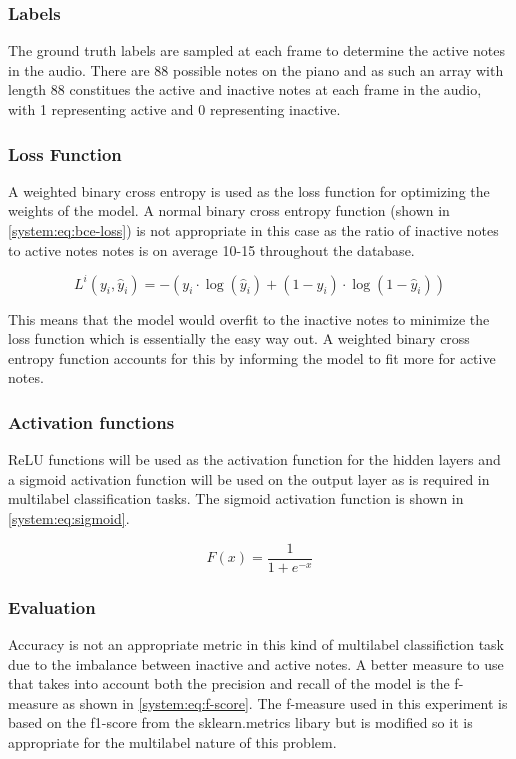 \subsubsection{Labels}
The ground truth labels are sampled at each frame to determine the active notes
in the audio. There are 88 possible notes on the piano and as such an array with
length 88 constitues the active and inactive notes at each frame in the audio,
with 1 representing active and 0 representing inactive.

\subsubsection{Loss Function}

A weighted binary cross entropy is used as the loss function for optimizing
the weights of the model. A normal binary cross entropy function (shown in \autoref{system:eq:bce-loss}) is not
appropriate in this case as the ratio of inactive notes to active notes notes is
on average 10-15 throughout the database.

\begin{equation}
    L^{i} (y_{i}, \hat{y}_{i}) = -(y_{i}\cdot \log(\hat{y}_{i}) + (1-y_{i}) \cdot \log(1-\hat{y}_{i}))
    \label{system:eq:bce-loss}
\end{equation}

This means that the model would overfit to the inactive notes to minimize the loss function which is essentially
the easy way out. A weighted binary cross entropy function accounts for this by
informing the model to fit more for active notes.

\subsubsection{Activation functions}

\ac{ReLU} functions will be used as the
activation function for the hidden layers and a sigmoid activation function will
be used on the output layer as is required in multilabel classification tasks. The sigmoid
activation function is shown in \autoref{system:eq:sigmoid}.

\begin{equation}
    F (x) = \frac{1}{1+ e^{-x}}
    \label{system:eq:sigmoid}
\end{equation}

\subsubsection{Evaluation}
Accuracy is not an appropriate metric in this kind of multilabel classifiction task due to the
imbalance between inactive and active notes. A better measure to use that takes into account both the
precision and recall of the model is the f-measure as shown in \autoref{system:eq:f-score}. The f-measure used in this experiment is based on the
f1-score from the sklearn.metrics libary but is modified so it is appropriate for the
multilabel nature of this problem.

